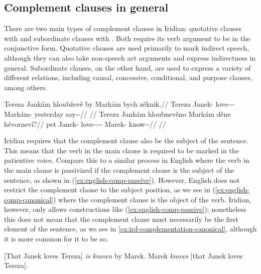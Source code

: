 \subsection{Complement clauses in general}\label{sec:complement-clauses}

There are two main types of complement clauses in Iridian: quotative clauses
with  and subordinate clauses with . Both require its verb
argument to be in the conjunctive form. Quotative clauses are used primarily to
mark indirect speech, although they can also take non-speech act arguments and
express indirectness in general. Subordinate clauses, on the other hand, are
used to express a variety of different relations, including causal, concessive,
conditional, and purpose clauses, among others.

\pex
\a \begingl
  \gla Tereza Jankám hloubževě by Markám bych zěknik.//
  \glb Tereza Janek-\Agt{} love-\Pv{}-\Cont{}-\Cnj{} \Quot{} Markám-\Agt{} yesterday say-\Pv{}-\Pf{}//
  \glft {}//
\endgl
\a \begingl
  \gla Tereza Jankám hloubnevěno Markám děne hévorneví?//
  \glb pet Janek-\Agt{} love-\Av{}-\Cont{}-\Cnj{}-\Comp{} Marek-\Agt{} \Spec{} know-\Pv{}-\Cont{}//
  \glft {}//
\endgl
\xe

Iridian requires that the complement clause also be the subject of the sentence.
This means that the verb in the main clause is required to be marked in the
patientive voice. Compare this to a similar process in English where the verb in
the main clause is passivized if the complement clause is the subject of the
sentence, as shown in (\ref{ex:english-comp-passive}). However, English does not
restrict the complement clause to the subject position, as we see in
(\ref{ex:english-comp-canonical}) where the complement clause is the object of
the verb. Iridian, however, only allows constructions like
(\ref{ex:english-comp-passive}); nonetheless this does not mean that the
complement clause must necessarily be the first element of the sentence, as we
see in \ref{ex:ird-complementation-canonical}, although it is more common for it
to be so. 

\pex
\a\label{ex:english-comp-passive} {[That Janek loves Tereza] \emph{is known} by Marek.}
\a\label{ex:english-comp-canonical} {Marek \emph{knows} [that Janek loves Tereza].}
\xe

\pex\label{ex:ird-complementation-canonical}
\xe

